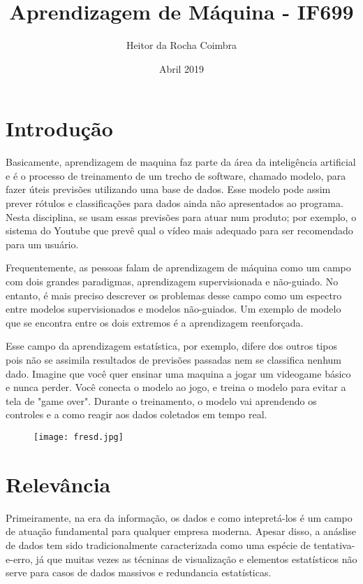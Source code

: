 \documentclass[10pt]{article}
\title{Aprendizagem de Máquina - IF699}
\author{Heitor da Rocha Coimbra}
\date{Abril 2019}
\begin{document}
\maketitle

\section{Introdução}
Basicamente, aprendizagem de maquina faz parte da área da inteligência artificial e é o processo de treinamento de um trecho de software, chamado modelo, para fazer úteis previsões utilizando uma base de dados. Esse modelo pode assim prever rótulos e classificações para dados ainda não apresentados ao programa. Nesta disciplina, se usam essas previsões para atuar num produto; por exemplo, o sistema do Youtube que prevê qual o vídeo mais adequado para ser recomendado para um usuário.\newline


Frequentemente, as pessoas falam de aprendizagem de máquina como um campo com dois grandes paradigmas, aprendizagem supervisionada e não-guiado. No entanto, é mais preciso descrever os problemas desse campo como um espectro entre modelos supervisionados e modelos não-guiados. Um exemplo de modelo que se encontra entre os dois extremos é a aprendizagem reenforçada.\newline


Esse campo da aprendizagem estatística, por exemplo, difere dos outros tipos pois não se assimila resultados de previsões passadas nem se classifica nenhum dado. Imagine que você quer ensinar uma maquina a jogar um videogame básico e nunca perder. Você conecta o modelo ao jogo, e treina o modelo para evitar a tela de "game over". Durante o treinamento, o modelo vai aprendendo os controles e a como reagir aos dados coletados em tempo real. \cite{google2019learning} 

\begin{figure}[h!]
\centering
\texttt{[image: fresd.jpg]}
\label{fig:fresdp.jpg}
\end{figure}

\section{Relevância}
Primeiramente, na era da informação, os dados e como intepretá-los é um campo de atuação fundamental para qualquer empresa moderna. Apesar disso, a anáslise de dados tem sido tradicionalmente caracterizada como uma espécie de tentativa-e-erro, já que muitas vezes as técninas de visualização e elementos estatísticos não serve para casos de dados massivos e redundancia estatísticas.\newline
\end{document}
